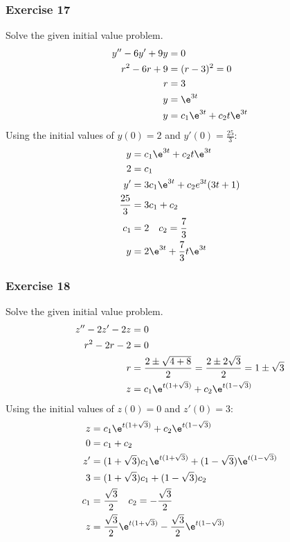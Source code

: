 \documentclass{math}
\begin{document}
\subsubsection*{Exercise 17}
Solve the given initial value problem.
\begin{align*}
  y''-6y'+9y &= 0 \\
  r^2-6r+9 &= (r-3)^2 = 0 \\
  r &= 3 \\
  y &= \e^{3t} \\
  y &= c_1\e^{3t}+c_2t\e^{3t}
\end{align*}
Using the initial values of \( y(0) = 2 \) and \( y'(0) = \frac{25}{3} \):
\begin{align*}
  y &= c_1\e^{3t}+c_2t\e^{3t} \\
  2 &= c_1 \\
  y' &= 3c_1\e^{3t}+c_2e^{3t}(3t+1) \\
  \frac{25}{3} &= 3c_1+c_2 \\
  c_1 &= 2 \quad c_2 = \frac{7}{3} \\
  y &= 2\e^{3t}+\frac{7}{3}t\e^{3t}
\end{align*}

\subsubsection*{Exercise 18}
Solve the given initial value problem.
\begin{align*}
  z''-2z'-2z &= 0 \\
  r^2-2r-2 &= 0 \\
  r &= \frac{2\pm\sqrt{4+8}}{2} = \frac{2\pm2\sqrt{3}}{2} = 1\pm\sqrt{3} \\
  z &= c_1\e^{t(1+\sqrt{3})}+c_2\e^{t(1-\sqrt{3})}
\end{align*}
Using the initial values of \( z(0) = 0 \) and \( z'(0) = 3 \):
\begin{align*}
  z &= c_1\e^{t(1+\sqrt{3})}+c_2\e^{t(1-\sqrt{3})} \\
  0 &= c_1+c_2 \\
  z' &= (1+\sqrt{3})c_1\e^{t(1+\sqrt{3})}+(1-\sqrt{3})\e^{t(1-\sqrt{3})} \\
  3 &= (1+\sqrt{3})c_1+(1-\sqrt{3})c_2 \\
  c_1 &= \frac{\sqrt{3}}{2} \quad c_2 = -\frac{\sqrt{3}}{2} \\
  z &= \frac{\sqrt{3}}{2}\e^{t(1+\sqrt{3})}-\frac{\sqrt{3}}{2}\e^{t(1-\sqrt{3})}
\end{align*}
\end{document}
